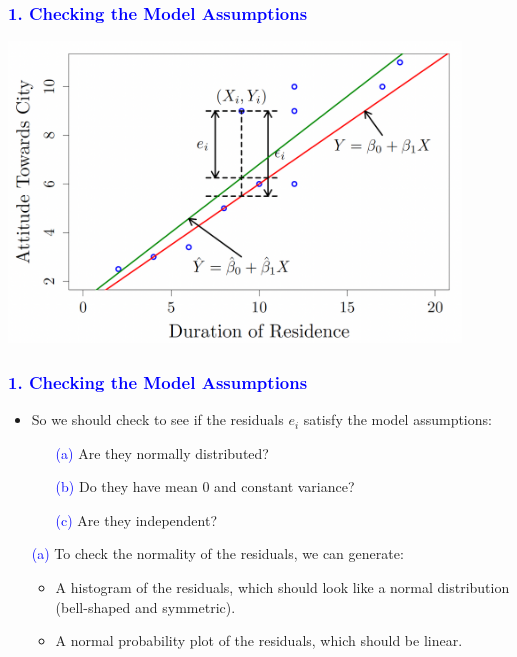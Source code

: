 \documentclass[12pt]{beamer}
\begin{document}
\begin{frame}
	\frametitle{\textcolor{blue}{1. Checking the Model Assumptions}}
	\centering
\includegraphics[width=12cm]{check.png}
\end{frame}
\begin{frame}
	\frametitle{\textcolor{blue}{1. Checking the Model Assumptions}}
	
	\begin{itemize}[label={\color{blue}$\blacktriangleright$}]
		\item So we should check to see if the residuals $e_i$ satisfy the model assumptions:
		\begin{enumerate}
			\item[\textcolor{blue}{(a)}] Are they normally distributed?
			\item[\textcolor{blue}{(b)}] Do they have mean 0 and constant variance?
			\item[\textcolor{blue}{(c)}] Are they independent?
		\end{enumerate}
		
		\item[\textcolor{blue}{(a)}] To check the normality of the residuals, we can generate:
		\begin{itemize}[label={\color{blue}$\blacktriangleright$}]
			\item A histogram of the residuals, which should look like a normal distribution (bell-shaped and symmetric).
			\item A normal probability plot of the residuals, which should be linear.
		\end{itemize}
	\end{itemize}
	
\end{frame}
\end{document}
